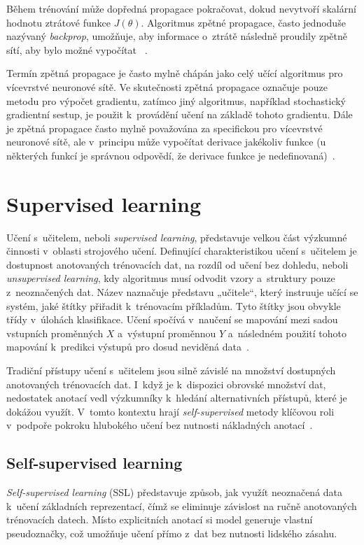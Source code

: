 Během trénování může dopředná propagace pokračovat, dokud nevytvoří skalární hodnotu ztrátové funkce $J(\theta)$. Algoritmus zpětné propagace, často jednoduše nazývaný \textit{back\-prop}, umožňuje, aby informace o~ztrátě následně proudily zpětně sítí, aby bylo možné vypočítat ~\cite{Goodfellow-et-al-2016}.

Termín zpětná propagace je často mylně chápán jako celý učící algoritmus pro vícevrstvé neuronové sítě. Ve skutečnosti zpětná propagace označuje pouze metodu pro výpočet gradientu, zatímco jiný algoritmus, například stochastický gradientní sestup, je použit k~provádění učení na základě tohoto gradientu. Dále je zpětná propagace často mylně považována za specifickou pro vícevrstvé neuronové sítě, ale v~principu může vypočítat derivace jakékoliv funkce (u některých funkcí je správnou odpovědí, že derivace funkce je nedefinovaná)~\cite{Goodfellow-et-al-2016}.

\section{Supervised learning}
Učení s~učitelem, neboli \textit{supervised learning}, představuje velkou část výzkumné činnosti v~oblasti strojového učení. Definující charakteristikou učení s~učitelem je dostupnost anotovaných trénovacích dat, na rozdíl od učení bez dohledu, neboli \textit{unsupervised learning}, kdy algoritmus musí odvodit vzory a~struktury pouze z~neoznačených dat. Název naznačuje představu „učitele“, který instruuje učící se systém, jaké štítky přiřadit k~trénovacím příkladům. Tyto štítky jsou obvykle třídy v~úlohách klasifikace. Učení spočívá v~naučení se mapování mezi sadou vstupních proměnných $X$ a~výstupní proměnnou $Y$ a~následném použití tohoto mapování k~predikci výstupů pro dosud neviděná data~\cite{Cunningham2008}. 

Tradiční přístupy učení s~učitelem jsou silně závislé na množství dostupných anotovaných trénovacích dat. I~když je k~dispozici obrovské množství dat, nedostatek anotací vedl výzkumníky k~hledání alternativních přístupů, které je dokážou využít. V~tomto kontextu hrají \textit{self-supervised} metody klíčovou roli v~podpoře pokroku hlubokého učení bez nutnosti nákladných anotací~\cite{technologies9010002}.

\subsection{Self-supervised learning}
\textit{Self-supervised learning} (SSL) představuje způsob, jak využít neoznačená data k~učení základních reprezentací, čímž se eliminuje závislost na ručně anotovaných trénovacích datech. Místo explicitních anotací si model generuje vlastní pseudoznačky, což umožňuje učení přímo z~dat bez nutnosti lidského zásahu.

